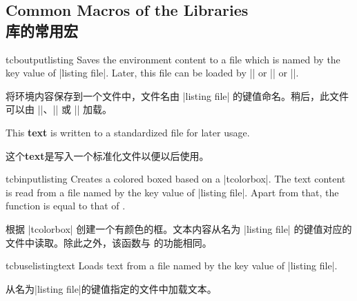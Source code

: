 \subsection{Common Macros of the Libraries\\库的常用宏}






\begin{docEnvironment}{tcboutputlisting}{}
Saves the environment content to a file which is named by the key value of
|listing file|. Later, this file can be loaded by
|\tcbinputlisting| or |\tcbuselistingtext| or |\tcbuselistinglisting|.

将环境内容保存到一个文件中，文件名由 |listing file| 的键值命名。稍后，此文件可以由 |\tcbinputlisting|、|\tcbuselistingtext| 或 |\tcbuselistinglisting| 加载。
\begin{dispListing}
\begin{tcboutputlisting}
This \textbf{text} is written to a standardized file for later usage.

这个\textbf{text}是写入一个标准化文件以便以后使用。
\end{tcboutputlisting}
\end{dispListing}
\end{docEnvironment}


\begin{docCommand}{tcbinputlisting}{}
Creates a colored boxed based on a |tcolorbox|. The text content is read
from a file named by the key value of |listing file|. Apart from that,
the function is equal to that of .

根据 |tcolorbox| 创建一个有颜色的框。文本内容从名为 |listing file| 的键值对应的文件中读取。除此之外，该函数与  的功能相同。
\begin{dispExample}
\end{dispExample}
\end{docCommand}

\begin{docCommand}{tcbuselistingtext}{}
Loads text from a file named by the key value of |listing file|.

从名为|listing file|的键值指定的文件中加载文本。
\begin{dispExample}
\tcbuselistingtext
\end{dispExample}
\end{docCommand}


